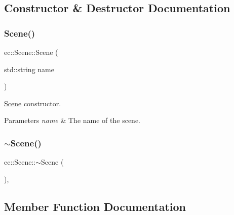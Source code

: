 \subsection{Constructor \& Destructor Documentation}
\mbox{\label{classec_1_1_scene_a9abac0a0de42ff4e9eb6481cf1927754}} 
\subsubsection{\texorpdfstring{Scene()}{Scene()}}
{\footnotesize\ttfamily ec\+::\+Scene\+::\+Scene (\begin{DoxyParamCaption}\item[{std\+::string}]{name }\end{DoxyParamCaption})\hspace{0.3cm}{\ttfamily [explicit]}}



\mbox{\hyperlink{classec_1_1_scene}{Scene}} constructor. 


\begin{DoxyParams}{Parameters}
{\em name} & The name of the scene. \\
\hline
\end{DoxyParams}
\mbox{\label{classec_1_1_scene_a25e849d1bd5a9a71af922c3668115cb6}} 
\subsubsection{\texorpdfstring{$\sim$\+Scene()}{~Scene()}}
{\footnotesize\ttfamily ec\+::\+Scene\+::$\sim$\+Scene (\begin{DoxyParamCaption}{ }\end{DoxyParamCaption})\hspace{0.3cm}{\ttfamily [virtual]}, {\ttfamily [default]}}



\subsection{Member Function Documentation}
\mbox{\label{classec_1_1_scene_a05bf59f23abb809000ad17bdb00cab94}} 
